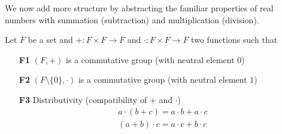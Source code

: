 \begin{frame}
	We now add more structure by abstracting the familiar properties of real numbers with summation (subtraction) and multiplication (division).
	\begin{definition}[Field]
		 Let $F$ be a set and $+\colon F \times F \to F$ and $\cdot:F\times F \to F$ two functions such that
		 \begin{itemize}
		 	\item[\textbf{F1}] $(F,+)$ is a commutative group (with neutral element $0$)
		 	\item[\textbf{F2}] $(F\setminus \{0\},\cdot)$ is a commutative group (with neutral element $1$)
		 	\item[\textbf{F3}] Distributivity (compatibility of $+$ and $\cdot$)
					\begin{align*}
					 a \cdot (b+c) = a\cdot b + a \cdot c\\
					 (a+b) \cdot c= a\cdot c + b \cdot c
					\end{align*} 
		 \end{itemize}
	\end{definition}
\end{frame}

